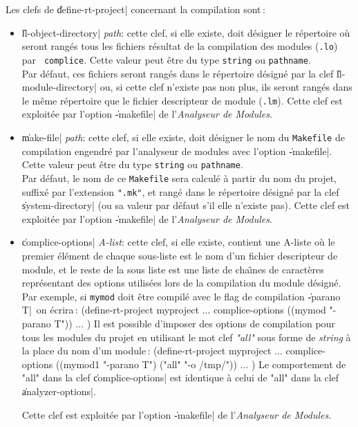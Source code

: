 Les clefs de \|define-rt-project| concernant la compilation sont\,:
\begin{itemize}

\item {\Large \|ll-object-directory| {\em path}}: cette clef, si elle existe,
doit d\'{e}signer le r\'{e}pertoire o\`{u} seront rang\'{e}s tous les fichiers
r\'{e}sultat de la compilation des modules ({\tt .lo}) par {\tt
complice}. Cette
valeur peut \^{e}tre du type {\tt string} ou {\tt pathname}.  \\
Par d\'{e}faut, ces fichiers seront
rang\'{e}s dans le r\'{e}pertoire d\'{e}sign\'{e} par la clef
\|ll-module-directory| ou, si cette clef n'existe pas non plus, ils
seront rang\'{e}s dans le m\^{e}me r\'{e}pertoire que le fichier descripteur
de module ({\tt .lm}).
Cette clef est exploit\'{e}e par l'option \|-makefile| de
l'{\em Analyseur de Modules}.

\item {\Large \|make-file| {\em path}}: cette clef, si elle existe, doit
d\'{e}signer le nom du {\tt Makefile} de compilation engendr\'{e} par l'analyseur
de modules avec l'option \|-makefile|. Cette
valeur peut \^{e}tre du type {\tt string} ou {\tt pathname}. \\
Par d\'{e}faut, le nom de ce {\tt Makefile} sera calcul\'{e} \`{a}
partir du nom du projet, suffix\'{e} par l'extension {\tt ".mk"}, et
rang\'{e} dans le r\'{e}pertoire d\'{e}sign\'{e} par la clef \|system-directory|
(ou sa valeur par d\'{e}faut s'il elle n'existe pas).
Cette clef est exploit\'{e}e par l'option \|-makefile| de l'{\em Analyseur de
Modules}.

\item {\Large \|complice-options| {\em A-list}}: cette clef, si elle existe,
contient une A-liste o\`{u} le premier \'{e}l\'{e}ment de chaque sous-liste est le
nom d'un fichier descripteur de module, et le reste de la sous liste
est une liste de cha\^{\i}nes de caract\`{e}res repr\'{e}sentant des options
utilis\'{e}es lors de la compilation du module d\'{e}sign\'{e}. \\
Par exemple, si {\tt mymod} doit \^{e}tre
compil\'{e} avec le flag de compilation \|-parano T|\, on \'{e}crira\,:
\BeginLL
(define-rt-project myproject
  ...
  complice-options ((mymod "-parano T"))
  ...
)
\EndLL
Il est possible d'imposer des options de compilation pour tous les modules
du projet en utilisant le mot clef {\em "all"} sous forme de {\it
string} \`{a} la place du nom d'un module\,:
\BeginLL
(define-rt-project myproject
  ...
  complice-options ((mymod1 "-parano T")
                    ("all" "-o /tmp/"))
  ...
)
\EndLL
Le comportement de "all" dans la clef \|complice-options| est
identique \`{a} celui de "all" dans la clef \|analyzer-options|.

Cette clef est exploit\'{e}e par l'option \|-makefile| de l'{\em Analyseur de
Modules}.

\end{itemize}


